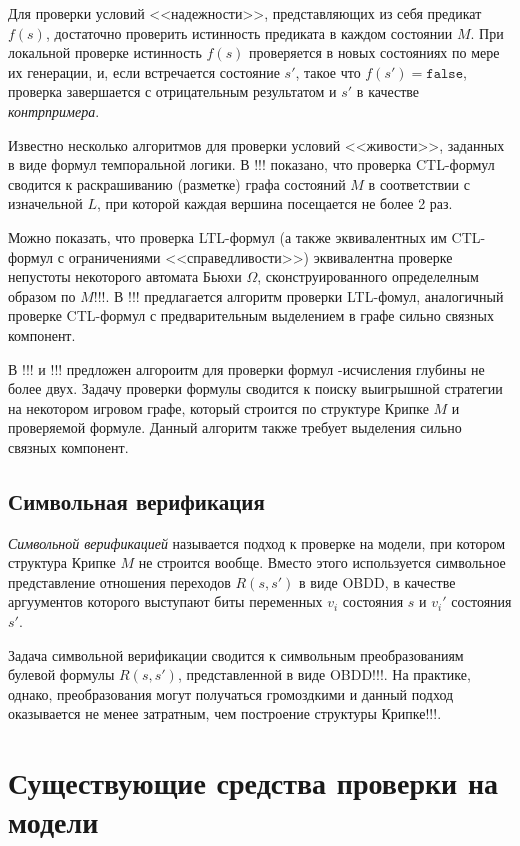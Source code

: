 \documentclass[a4paper,notitlepage,14pt]{article}
\begin{document}
Для проверки условий <<надежности>>, представляющих из себя предикат $f(s)$, достаточно
проверить истинность предиката в каждом состоянии $M$. При локальной проверке истинность
$f(s)$ проверяется в новых состояниях по мере их генерации, и, если встречается состояние
$s'$, такое что $f(s') = \mathtt{false}$, проверка завершается с отрицательным результатом
и $s'$ в качестве \emph{контрпримера}.

Известно несколько алгоритмов для проверки условий <<живости>>, заданных в виде формул
темпоральной логики. В !!! показано, что проверка CTL-формул сводится к раскрашиванию
(разметке) графа состояний $M$ в соответствии с изначельной $L$, при которой каждая
вершина посещается не более 2 раз. 

Можно показать, что проверка LTL-формул (а также эквивалентных им CTL-формул с
ограничениями <<справедливости>>) эквивалентна проверке непустоты некоторого автомата
Бьюхи $\Omega$, сконструированного определелным образом по $M$!!!. В !!! предлагается
алгоритм проверки LTL-фомул, аналогичный проверке CTL-формул с предварительным выделением
в графе сильно связных компонент.

В !!! и !!! предложен алгороитм для проверки формул \mu-исчисления глубины не более
двух. Задачу проверки формулы сводится к поиску выигрышной стратегии на некотором игровом
графе, который строится по структуре Крипке $M$ и проверяемой формуле. Данный алгоритм
также требует выделения сильно связных компонент.

\subsection{Символьная верификация}
\label{sec:symbolic}

\emph{Символьной верификацией} называется подход к проверке на модели, при котором
структура Крипке $M$ не строится вообще. Вместо этого используется символьное
представление отношения переходов $R(s, s')$ в виде OBDD, в качестве аргуументов которого
выступают биты переменных $v_i$ состояния $s$ и $v_i'$ состояния $s'$.

Задача символьной верификации сводится к символьным преобразованиям булевой формулы $R(s,
s')$, представленной в виде OBDD!!!. На практике, однако, преобразования могут получаться
громоздкими и данный подход оказывается не менее затратным, чем построение структуры
Крипке!!!.

\section{Существующие средства проверки на модели}
\label{sec:existing-tools}
\end{document}
